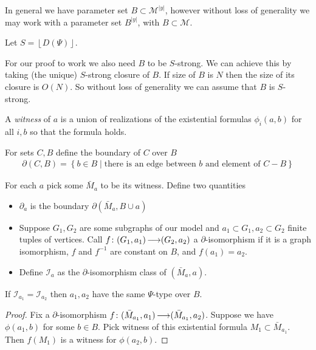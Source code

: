 \documentclass{amsart}
\newcommand{\II}{\mathscr I}
\newcommand{\MM}{\mathscr M}
\newcommand{\curly}[1]{\left\{#1\right\}}
\providecommand{\floor}[1]{\left \lfloor #1 \right \rfloor }
\begin{document}
In general we have parameter set $B \subset \MM^{|y|}$, however without loss of generality we may work with
a parameter set $B^{|y|}$, with $B \subset \MM$.

Let $S = \floor{D(\Psi)}$.

For our proof to work we also need $B$ to be $S$-strong.
We can achieve this by taking (the unique) $S$-strong closure of $B$.
If size of $B$ is $N$ then the size of its closure is $O(N)$.	%
So without loss of generality we can assume that $B$ is $S$-strong.

\begin{Definition}
	A \emph{witness} of $a$ is a union of realizations of the existential formulas $\phi_i(a, b)$ for all $i, b$ so that the formula holds.
\end{Definition}



\begin{Definition}
	For sets $C, B$ define the boundary of $C$ over $B$
	\begin{align*}
		\partial(C, B) = \curly{b \in B \mid \text{there is an edge between $b$ and element of $C - B$}}
	\end{align*}
\end{Definition}

\begin{Definition}
	For each $a$ pick some $\bar M_a$ to be its witness.
	Define two quantities
	\begin{itemize}
		\item $\partial_a$ is the boundary $\partial(\bar M_a, B \cup a)$
		\item Suppose $G_1, G_2$ are some subgraphs of our model and $a_1 \subset G_1, a_2 \subset G_2$ finite tuples of vertices.
		Call $f \colon (G_1, a_1) \operatorname{\longrightarrow} (G_2, a_2)$ a $\partial$-isomorphism if it is a graph isomorphism,
		$f$ and $f^{-1}$ are constant on $B$, and
		$f(a_1) = a_2$.
		\item Define $\II_a$ as the $\partial$-isomorphism class of $(\bar M_a, a)$.
	\end{itemize}
\end{Definition}

\begin{Lemma} \label {bound_trace}
	If $\II_{a_1} = \II_{a_2}$ then $a_1, a_2$ have the same $\Psi$-type over $B$.
\end{Lemma}

\begin{proof}
	Fix a $\partial$-isomorphism $f \colon (\bar M_{a_1}, a_1) \operatorname{\longrightarrow} (\bar M_{a_1}, a_2)$.
	Suppose we have $\phi(a_1, b)$ for some $b \in B$.
	Pick witness of this existential formula $M_1 \subset \bar M_{a_1}$.
	Then $f(M_1)$ is a witness for  $\phi(a_2, b)$.
\end{proof}
\end{document}
